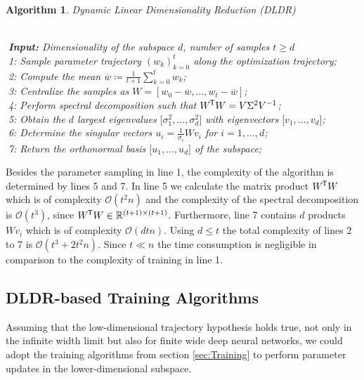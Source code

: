 \documentclass[11pt, a4paper]{article}
\newtheorem{algorithm}[theorem]{Algorithm}
\newcommand{\R}{\mathbb{R}}
\renewcommand{\O}{\mathcal{O}}
\newcommand*{\tr}{^{\mkern-1.5mu\mathsf{T}}}
\begin{document}
\begin{algorithm}
\caption{Dynamic Linear Dimensionality Reduction (DLDR) \textcolor{white}{$\Big |$}} \ \\
\textcolor{white}{$\Big |$}\textbf{Input:} Dimensionality of the subspace $d$, number of samples $t \geq d$ \\
\textcolor{white}{$\Big |$}1: Sample parameter trajectory $(w_k)_{k=0}^{t}$ along the optimization trajectory; \\
\textcolor{white}{$\Big |$}2: Compute the mean $\overline{w} \coloneq \frac{1}{t+1} \sum_{k=0}^{t} w_k$; \\
\textcolor{white}{$\Big |$}3: Centralize the samples as $W = [w_0-\overline{w}, \dots, w_t - \overline{w}]$; \\
\textcolor{white}{$\Big |$}4: Perform spectral decomposition such that $W\tr W = V \Sigma^2 V^{-1}$;  \\
\textcolor{white}{$\Big |$}5: Obtain the $d$ largest eigenvalues $\big [\sigma_1^2, \dots, \sigma_d^2 \big ]$ with eigenvectors $ \big [v_1, \dots, v_d \big ]$; \\
\textcolor{white}{$\Big |$}6: Determine the singular vectors $u_i = \frac{1}{\sigma_i}Wv_i$ for $i=1, \dots, d$; \\
\textcolor{white}{$\Big |$}7: Return the orthonormal basis $ \big [u_1, \dots, u_d \big ]$ of the subspace;
\end{algorithm}

Besides the parameter sampling in line 1, the complexity of the algorithm is determined by lines 5 and 7. In line 5 we calculate the matrix product $W \tr W$ which is of complexity $\O(t^2n)$ and the complexity of the spectral decomposition is $\O(t^3)$, since $W\tr W \in \R^{(t+1) \times (t+1)}$. Furthermore, line 7 contains $d$ products $Wv_i$ which is of complexity $\O(dtn)$. Using $d\leq t$ the total complexity of lines 2 to 7 is $\O(t^3 + 2t^2n)$. Since $t \ll n$ the time consumption is negligible in comparison to the complexity of training in line 1.

\subsection{DLDR-based Training Algorithms}

Assuming that the low-dimensional trajectory hypothesis holds true, not only in the infinite width limit but also for finite wide deep neural networks, we could adopt the training algorithms from section \ref{sec:Training} to perform parameter updates in the lower-dimensional subspace. \\
\end{document}
